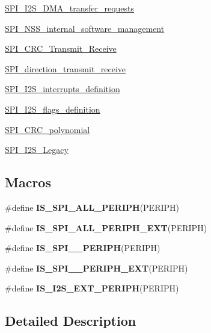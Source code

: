 \begin{DoxyCompactItemize}
\item 
\mbox{\hyperlink{group___s_p_i___i2_s___d_m_a__transfer__requests}{S\+P\+I\+\_\+\+I2\+S\+\_\+\+D\+M\+A\+\_\+transfer\+\_\+requests}}
\item 
\mbox{\hyperlink{group___s_p_i___n_s_s__internal__software__management}{S\+P\+I\+\_\+\+N\+S\+S\+\_\+internal\+\_\+software\+\_\+management}}
\item 
\mbox{\hyperlink{group___s_p_i___c_r_c___transmit___receive}{S\+P\+I\+\_\+\+C\+R\+C\+\_\+\+Transmit\+\_\+\+Receive}}
\item 
\mbox{\hyperlink{group___s_p_i__direction__transmit__receive}{S\+P\+I\+\_\+direction\+\_\+transmit\+\_\+receive}}
\item 
\mbox{\hyperlink{group___s_p_i___i2_s__interrupts__definition}{S\+P\+I\+\_\+\+I2\+S\+\_\+interrupts\+\_\+definition}}
\item 
\mbox{\hyperlink{group___s_p_i___i2_s__flags__definition}{S\+P\+I\+\_\+\+I2\+S\+\_\+flags\+\_\+definition}}
\item 
\mbox{\hyperlink{group___s_p_i___c_r_c__polynomial}{S\+P\+I\+\_\+\+C\+R\+C\+\_\+polynomial}}
\item 
\mbox{\hyperlink{group___s_p_i___i2_s___legacy}{S\+P\+I\+\_\+\+I2\+S\+\_\+\+Legacy}}
\end{DoxyCompactItemize}
\subsection*{Macros}
\begin{DoxyCompactItemize}
\item 
\#define {\bfseries I\+S\+\_\+\+S\+P\+I\+\_\+\+A\+L\+L\+\_\+\+P\+E\+R\+I\+PH}(P\+E\+R\+I\+PH)
\item 
\#define {\bfseries I\+S\+\_\+\+S\+P\+I\+\_\+\+A\+L\+L\+\_\+\+P\+E\+R\+I\+P\+H\+\_\+\+E\+XT}(P\+E\+R\+I\+PH)
\item 
\#define {\bfseries I\+S\+\_\+\+S\+P\+I\+\_\+\_\+\+P\+E\+R\+I\+PH}(P\+E\+R\+I\+PH)
\item 
\#define {\bfseries I\+S\+\_\+\+S\+P\+I\+\_\+\_\+\+P\+E\+R\+I\+P\+H\+\_\+\+E\+XT}(P\+E\+R\+I\+PH)
\item 
\#define {\bfseries I\+S\+\_\+\+I2\+S\+\_\+\+E\+X\+T\+\_\+\+P\+E\+R\+I\+PH}(P\+E\+R\+I\+PH)
\end{DoxyCompactItemize}


\subsection{Detailed Description}


